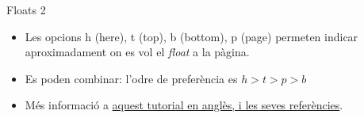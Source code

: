 \begin{frame}[fragile]{Floats 2}
\begin{itemize}
\item Les opcions h (here), t (top), b (bottom), p (page) permeten indicar aproximadament on es vol el \textit{float} a la pàgina.
\item Es poden combinar: l'odre de preferència es $h > t > p> b$
\item Més informació a \href{https://www.overleaf.com/latex/examples/understanding-floats/qkjpvqptqrwd}{aquest tutorial en anglès, i les seves referències}.
\end{itemize}

\end{frame}

